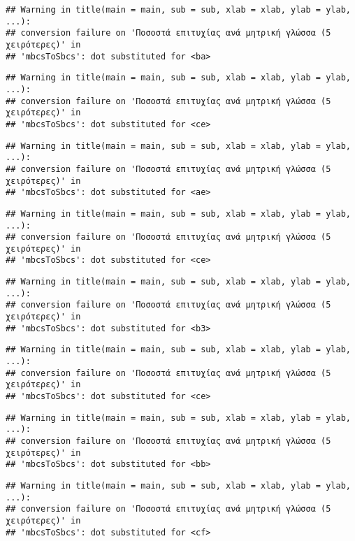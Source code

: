 \documentclass[
]{article}
\begin{document}
\begin{verbatim}
## Warning in title(main = main, sub = sub, xlab = xlab, ylab = ylab, ...):
## conversion failure on 'Ποσοστά επιτυχίας ανά μητρική γλώσσα (5 χειρότερες)' in
## 'mbcsToSbcs': dot substituted for <ba>
\end{verbatim}

\begin{verbatim}
## Warning in title(main = main, sub = sub, xlab = xlab, ylab = ylab, ...):
## conversion failure on 'Ποσοστά επιτυχίας ανά μητρική γλώσσα (5 χειρότερες)' in
## 'mbcsToSbcs': dot substituted for <ce>
\end{verbatim}

\begin{verbatim}
## Warning in title(main = main, sub = sub, xlab = xlab, ylab = ylab, ...):
## conversion failure on 'Ποσοστά επιτυχίας ανά μητρική γλώσσα (5 χειρότερες)' in
## 'mbcsToSbcs': dot substituted for <ae>
\end{verbatim}

\begin{verbatim}
## Warning in title(main = main, sub = sub, xlab = xlab, ylab = ylab, ...):
## conversion failure on 'Ποσοστά επιτυχίας ανά μητρική γλώσσα (5 χειρότερες)' in
## 'mbcsToSbcs': dot substituted for <ce>
\end{verbatim}

\begin{verbatim}
## Warning in title(main = main, sub = sub, xlab = xlab, ylab = ylab, ...):
## conversion failure on 'Ποσοστά επιτυχίας ανά μητρική γλώσσα (5 χειρότερες)' in
## 'mbcsToSbcs': dot substituted for <b3>
\end{verbatim}

\begin{verbatim}
## Warning in title(main = main, sub = sub, xlab = xlab, ylab = ylab, ...):
## conversion failure on 'Ποσοστά επιτυχίας ανά μητρική γλώσσα (5 χειρότερες)' in
## 'mbcsToSbcs': dot substituted for <ce>
\end{verbatim}

\begin{verbatim}
## Warning in title(main = main, sub = sub, xlab = xlab, ylab = ylab, ...):
## conversion failure on 'Ποσοστά επιτυχίας ανά μητρική γλώσσα (5 χειρότερες)' in
## 'mbcsToSbcs': dot substituted for <bb>
\end{verbatim}

\begin{verbatim}
## Warning in title(main = main, sub = sub, xlab = xlab, ylab = ylab, ...):
## conversion failure on 'Ποσοστά επιτυχίας ανά μητρική γλώσσα (5 χειρότερες)' in
## 'mbcsToSbcs': dot substituted for <cf>
\end{verbatim}
\end{document}
